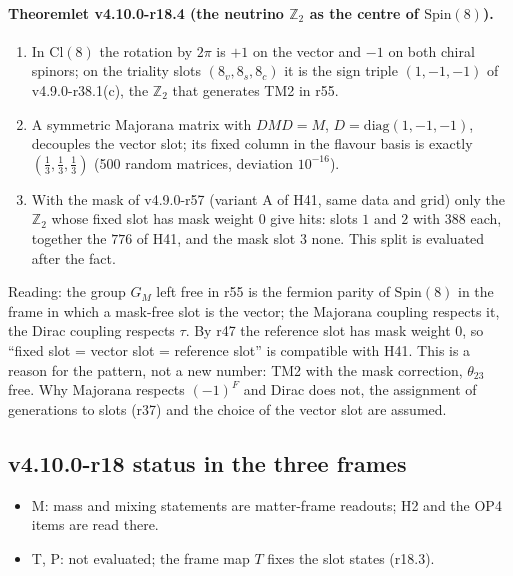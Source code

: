 \paragraph{Theoremlet v4.10.0-r18.4 (the neutrino \(\mathbb Z_2\) as the centre of \(\mathrm{Spin}(8)\)).}
\begin{enumerate}[leftmargin=2em]
\item[(a)] In \(\mathrm{Cl}(8)\) the rotation by \(2\pi\) is \(+1\) on the vector and \(-1\) on both chiral spinors; on the triality slots
\((8_v,8_s,8_c)\) it is the sign triple \((1,-1,-1)\) of v4.9.0-r38.1(c), the \(\mathbb Z_2\) that generates TM2 in r55.
\item[(b)] A symmetric Majorana matrix with \(DMD=M\), \(D=\mathrm{diag}(1,-1,-1)\), decouples the vector slot; its fixed column in the flavour
basis is exactly \((\tfrac13,\tfrac13,\tfrac13)\) (500 random matrices, deviation \(10^{-16}\)).
\item[(c)] With the mask of v4.9.0-r57 (variant A of H41, same data and grid) only the \(\mathbb Z_2\) whose fixed slot has mask weight \(0\) give hits:
slots \(1\) and \(2\) with \(388\) each, together the \(776\) of H41, and the mask slot \(3\) none.  This split is evaluated after the fact.
\end{enumerate}
Reading: the group \(G_M\) left free in r55 is the fermion parity of \(\mathrm{Spin}(8)\) in the frame in which a mask-free slot is the vector;
the Majorana coupling respects it, the Dirac coupling respects \(\tau\).  By r47 the reference slot has mask weight \(0\), so ``fixed slot =
vector slot = reference slot'' is compatible with H41.  This is a reason for the pattern, not a new number: TM2 with the mask correction,
\(\theta_{23}\) free.  Why Majorana respects \((-1)^F\) and Dirac does not, the assignment of generations to slots (r37) and the choice of the
vector slot are assumed.

\subsection*{v4.10.0-r18 status in the three frames}
\label{subsec:v4100-r18-frames}

\begin{itemize}[leftmargin=2em]
\item M: mass and mixing statements are matter-frame readouts; H2 and the OP4 items are read there.
\item T, P: not evaluated; the frame map \(T\) fixes the slot states (r18.3).
\end{itemize}

